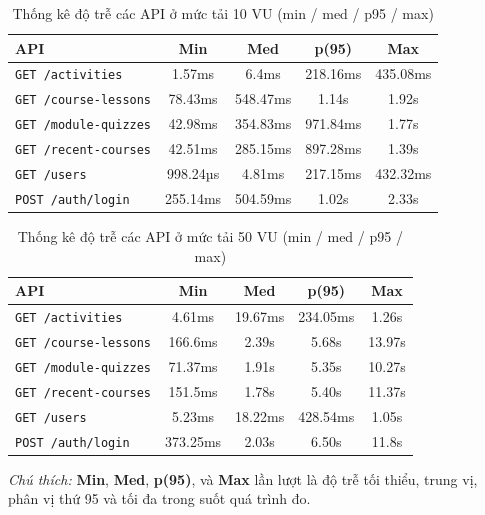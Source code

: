 \begin{table}[H]
\centering
\caption{Thống kê độ trễ các API ở mức tải 10 VU (min / med / p95 / max)}
\begin{tabular}{lcccc}
\toprule
\textbf{API} & \textbf{Min} & \textbf{Med} & \textbf{p(95)} & \textbf{Max} \\
\midrule
\texttt{GET /activities}         & 1.57ms   & 6.4ms    & 218.16ms & 435.08ms \\
\texttt{GET /course-lessons}     & 78.43ms  & 548.47ms & 1.14s    & 1.92s    \\
\texttt{GET /module-quizzes}     & 42.98ms  & 354.83ms & 971.84ms & 1.77s    \\
\texttt{GET /recent-courses}     & 42.51ms  & 285.15ms & 897.28ms & 1.39s    \\
\texttt{GET /users}              & 998.24µs & 4.81ms   & 217.15ms & 432.32ms \\
\texttt{POST /auth/login}        & 255.14ms & 504.59ms & 1.02s    & 2.33s    \\
\bottomrule
\end{tabular}
\end{table}

\begin{table}[H]
\centering
\caption{Thống kê độ trễ các API ở mức tải 50 VU (min / med / p95 / max)}
\begin{tabular}{lcccc}
\toprule
\textbf{API} & \textbf{Min} & \textbf{Med} & \textbf{p(95)} & \textbf{Max} \\
\midrule
\texttt{GET /activities}         & 4.61ms   & 19.67ms  & 234.05ms & 1.26s    \\
\texttt{GET /course-lessons}     & 166.6ms  & 2.39s    & 5.68s    & 13.97s   \\
\texttt{GET /module-quizzes}     & 71.37ms  & 1.91s    & 5.35s    & 10.27s   \\
\texttt{GET /recent-courses}     & 151.5ms  & 1.78s    & 5.40s    & 11.37s   \\
\texttt{GET /users}              & 5.23ms   & 18.22ms  & 428.54ms & 1.05s    \\
\texttt{POST /auth/login}        & 373.25ms & 2.03s    & 6.50s    & 11.8s    \\
\bottomrule
\end{tabular}
\end{table}

\noindent\textit{Chú thích:} \textbf{Min}, \textbf{Med}, \textbf{p(95)}, và \textbf{Max} lần lượt là độ trễ tối thiểu, trung vị, phân vị thứ 95 và tối đa trong suốt quá trình đo.

